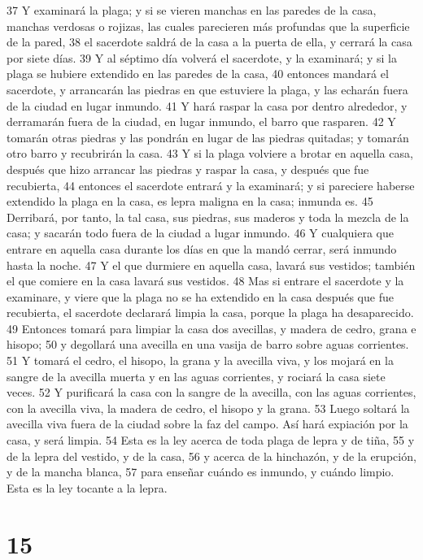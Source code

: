 37 Y examinará la plaga; y si se vieren manchas en las paredes de la casa, manchas verdosas o rojizas, las cuales parecieren más profundas que la superficie de la pared,
38 el sacerdote saldrá de la casa a la puerta de ella, y cerrará la casa por siete días.
39 Y al séptimo día volverá el sacerdote, y la examinará; y si la plaga se hubiere extendido en las paredes de la casa,
40 entonces mandará el sacerdote, y arrancarán las piedras en que estuviere la plaga, y las echarán fuera de la ciudad en lugar inmundo.
41 Y hará raspar la casa por dentro alrededor, y derramarán fuera de la ciudad, en lugar inmundo, el barro que rasparen.
42 Y tomarán otras piedras y las pondrán en lugar de las piedras quitadas; y tomarán otro barro y recubrirán la casa.
43 Y si la plaga volviere a brotar en aquella casa, después que hizo arrancar las piedras y raspar la casa, y después que fue recubierta,
44 entonces el sacerdote entrará y la examinará; y si pareciere haberse extendido la plaga en la casa, es lepra maligna en la casa; inmunda es.
45 Derribará, por tanto, la tal casa, sus piedras, sus maderos y toda la mezcla de la casa; y sacarán todo fuera de la ciudad a lugar inmundo.
46 Y cualquiera que entrare en aquella casa durante los días en que la mandó cerrar, será inmundo hasta la noche.
47 Y el que durmiere en aquella casa, lavará sus vestidos; también el que comiere en la casa lavará sus vestidos.
48 Mas si entrare el sacerdote y la examinare, y viere que la plaga no se ha extendido en la casa después que fue recubierta, el sacerdote declarará limpia la casa, porque la plaga ha desaparecido.
49 Entonces tomará para limpiar la casa dos avecillas, y madera de cedro, grana e hisopo;
50 y degollará una avecilla en una vasija de barro sobre aguas corrientes.
51 Y tomará el cedro, el hisopo, la grana y la avecilla viva, y los mojará en la sangre de la avecilla muerta y en las aguas corrientes, y rociará la casa siete veces.
52 Y purificará la casa con la sangre de la avecilla, con las aguas corrientes, con la avecilla viva, la madera de cedro, el hisopo y la grana.
53 Luego soltará la avecilla viva fuera de la ciudad sobre la faz del campo. Así hará expiación por la casa, y será limpia.
54 Esta es la ley acerca de toda plaga de lepra y de tiña,
55 y de la lepra del vestido, y de la casa,
56 y acerca de la hinchazón, y de la erupción, y de la mancha blanca,
57 para enseñar cuándo es inmundo, y cuándo limpio. Esta es la ley tocante a la lepra.

\chapter{15}

